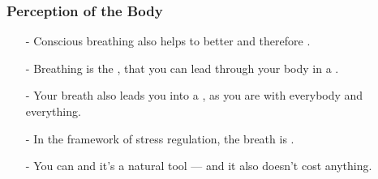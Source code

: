 \begin{frame}
\frametitle{Perception of the Body}

\begin{itemize}
\item[-] Conscious breathing also helps to better  and therefore .
\item[-] Breathing is the , that you can lead through your body in a .
\item[-] Your breath also leads you into a , as you are  with everybody and everything.
\item[-] In the framework of stress regulation, the breath is .
  \item[-] You can  and it's a natural tool --- and it also doesn't cost anything.
    \end{itemize}
\end{frame}

